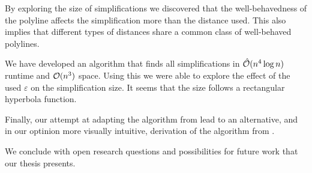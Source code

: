 By exploring the size of simplifications we discovered that the well-behavedness of the polyline affects the simplification more than the distance used. This also implies that different types of distances share a common class of well-behaved polylines. 

We have developed an algorithm that finds all simplifications in \(\hat{\mathcal{O}}(n^4\log n)\) runtime and \(\mathcal{O}(n^3)\) space. Using this we were able to explore the effect of the used \(\varepsilon\) on the simplification size. It seems that the size follows a rectangular hyperbola function.

Finally, our attempt at adapting the algorithm from \citeauthor{computational_geometric_methods_for_polygonal_approximations_of_a_curve} lead to an alternative, and in our optinion more visually intuitive, derivation of the algorithm from \citeauthor{global_curve_simplification}.

We conclude with open research questions and possibilities for future work that our thesis presents.

